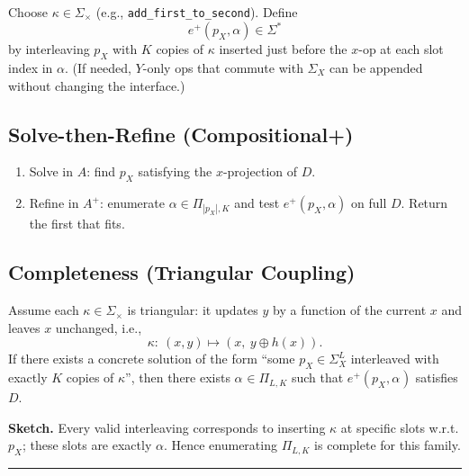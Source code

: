 \documentclass[11pt]{article}
\begin{document}
Choose $\kappa\in\Sigma_{\times}$ (e.g., \texttt{add\_first\_to\_second}).
Define
\begin{equation}
e^{+}(p_X,\alpha)\in \Sigma^{*}
\end{equation}
by interleaving $p_X$ with $K$ copies of $\kappa$ inserted just before the $x$-op at each slot index in $\alpha$. (If needed, $Y$-only ops that commute with $\Sigma_X$ can be appended without changing the interface.)

\subsection{Solve-then-Refine (Compositional+)}
\begin{enumerate}
    \item Solve in $A$: find $p_X$ satisfying the $x$-projection of $D$.
    \item Refine in $A^{+}$: enumerate $\alpha\in \Pi_{|p_X|,K}$ and test $e^{+}(p_X,\alpha)$ on full $D$. Return the first that fits.
\end{enumerate}

\subsection{Completeness (Triangular Coupling)}

Assume each $\kappa\in\Sigma_{\times}$ is triangular: it updates $y$ by a function of the current $x$ and leaves $x$ unchanged, i.e.,
\begin{equation}
\kappa:\ (x,y)\mapsto(x,\ y\oplus h(x)).
\end{equation}
If there exists a concrete solution of the form ``some $p_X\in\Sigma_X^{L}$ interleaved with exactly $K$ copies of $\kappa$'', then there exists $\alpha^{}\in\Pi_{L,K}$ such that $e^{+}(p_X,\alpha^{})$ satisfies $D$.

\textbf{Sketch.} Every valid interleaving corresponds to inserting $\kappa$ at specific slots w.r.t. $p_X$; these slots are exactly $\alpha$. Hence enumerating $\Pi_{L,K}$ is complete for this family.

\vspace{6pt}\noindent\rule{\textwidth}{0.4pt}\vspace{6pt}
\end{document}

